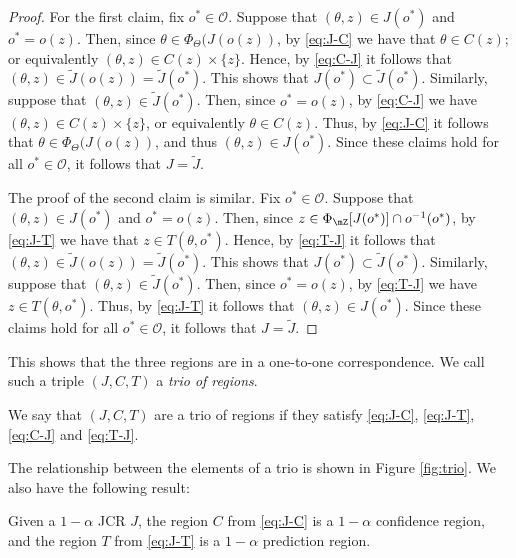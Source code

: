 \documentclass[english]{article}
\begin{document}
\begin{proof}
For the first claim, fix $o^*\in \mathcal{O}$. Suppose that $(\theta,z)\in J(o^*)$ and $o^*=o(z)$. Then, since $\theta \in \Phi_\Theta(J(o(z))$, by \eqref{eq:J-C} we have that $\theta \in C(z)$; or equivalently $(\theta,z)\in C(z)\times \{z\}$. 
Hence, by \eqref{eq:C-J} it follows that $(\theta,z)\in \tilde J(o(z)) = \tilde J(o^*)$. This shows that $J(o^*) \subset \tilde J(o^*)$. 
Similarly, suppose that $(\theta,z)\in \tilde J(o^*)$. 
Then, since $o^*=o(z)$, by \eqref{eq:C-J} we have $(\theta,z)\in C(z)\times \{z\}$, or equivalently $\theta \in C(z)$. Thus, by \eqref{eq:J-C} it follows that $\theta \in \Phi_\Theta(J(o(z))$, and thus $(\theta,z)\in J(o^*)$.
Since these claims hold for all $o^*\in \mathcal{O}$, it follows that $J = \tilde J$.

The proof of the second claim is similar. Fix $o^*\in \mathcal{O}$. 
Suppose that $(\theta,z)\in J(o^*)$ and $o^*=o(z)$. 
Then, since $z\in \Phi_{\mZ}[J(o^*)] \cap o^{-1}(o^*)$, by \eqref{eq:J-T} we have that $z \in T(\theta,o^*)$. Hence, by \eqref{eq:T-J} it follows that $(\theta,z)\in \tilde J(o(z)) = \tilde J(o^*)$. This shows that $J(o^*) \subset \tilde J(o^*)$. 
Similarly, suppose that $(\theta,z)\in \tilde J(o^*)$. Then, since $o^*=o(z)$, by \eqref{eq:T-J} we have $z \in T(\theta,o^*)$. Thus, by \eqref{eq:J-T} it follows that $(\theta,z)\in J(o^*)$.
Since these claims hold for all $o^*\in \mathcal{O}$, it follows that $J = \tilde J$.
\end{proof}

This shows that the three regions are in a one-to-one correspondence. We call such a triple $(J,C,T)$ a \emph{trio of regions}.
\begin{definition}\label{trio}
We say that $(J,C,T)$ are a trio of regions if they satisfy \eqref{eq:J-C}, \eqref{eq:J-T}, \eqref{eq:C-J} and \eqref{eq:T-J}.
\end{definition}

The relationship between the elements of a trio is shown in Figure \ref{fig:trio}. 
We also have the following result:
\begin{lemma}\label{J-RC}
 Given a $1-\alpha$ JCR $J$, the region  $C$ from \eqref{eq:J-C} is a $1-\alpha$ confidence region, and the region $T$ from \eqref{eq:J-T} is a $1-\alpha$ prediction region.
\end{lemma}
\end{document}
